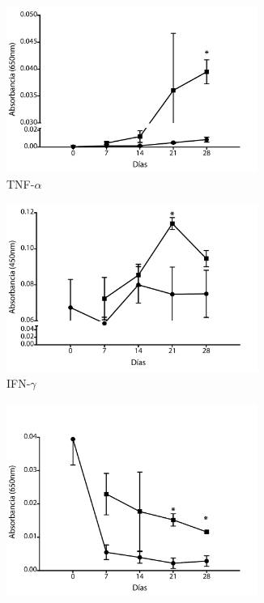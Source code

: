 \documentclass[12pt,letterpaper,oneside]{scrbook}
\begin{document}
\begin{figure}[h]
    \begin{subfigure}{0.5\textwidth}
        \includegraphics[width=0.9\textwidth]{eps/ELISA/pdf/etnfa}
        \caption{TNF-$\alpha$}
        \label{fig:elisa:tnfa}
        \end{subfigure}
    \begin{subfigure}{0.5\textwidth}
        \includegraphics[width=0.9\textwidth]{eps/ELISA/pdf/eifng}
        \caption{IFN-$\gamma$}
        \label{fig:elisa:ifng}
    \end{subfigure}
    \begin{subfigure}{0.5\textwidth}
        \includegraphics[width=0.9\textwidth]{eps/ELISA/pdf/eil1b}

\end{subfigure}
\end{figure}
\end{document}
